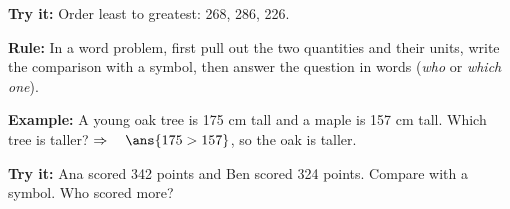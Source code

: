 \documentclass[12pt]{article}
\begin{document}
\begin{tryitbox}
\textbf{Try it:} \quad Order least to greatest: 268, 286, 226.\\[2pt]
\end{tryitbox}


\begin{formulabox}
\textbf{Rule:} In a word problem, first pull out the two quantities and their
units, write the comparison with a symbol, then answer the question in words
(\emph{who} or \emph{which one}).
\end{formulabox}

\begin{examplebox}
\textbf{Example:} \quad A young oak tree is 175 cm tall and a maple is 157 cm
tall. Which tree is taller?
$\Rightarrow\quad \ans{175 > 157}$, so the oak is taller.
\end{examplebox}

\begin{tryitbox}
\textbf{Try it:} \quad Ana scored 342 points and Ben scored 324 points.
Compare with a symbol. Who scored more?\\[2pt]
\end{tryitbox}
\end{document}

